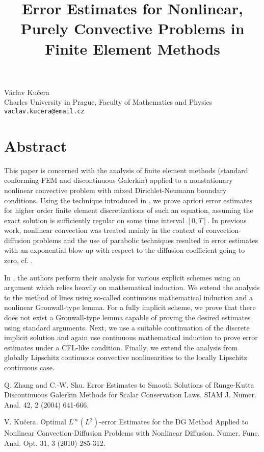 \title{Error Estimates for Nonlinear, Purely Convective Problems in Finite Element Methods}
 \author{} \institute{}
\maketitle
\begin{center}
{\large V\'{a}clav Ku\v{c}era}\\
Charles University in Prague, Faculty of Mathematics and Physics\\
{\tt vaclav.kucera@email.cz}

\end{center}

\section*{Abstract}

This paper is concerned with the analysis of finite element methods (standard conforming FEM and discontinuous Galerkin) applied to a nonstationary nonlinear convective problem with mixed Dirichlet-Neumann boundary conditions. Using the technique introduced in \cite{ZhangShu}, we prove apriori error estimates for higher order finite element discretizations of such an equation, assuming the exact solution is sufficiently regular on some time interval $[0,T]$. In previous work, nonlinear convection was treated mainly in the context of convection-diffusion problems and the use of parabolic techniques resulted in error estimates with an exponential blow up with respect to the diffusion coefficient going to zero, cf. \cite{Moje}. 

In \cite{ZhangShu}, the authors perform their analysis for various explicit schemes using an argument which relies heavily on mathematical induction. We extend the analysis to the method of lines using so-called continuous mathematical induction and a nonlinear Gronwall-type lemma. For a fully implicit scheme, we prove that there does not exist a Gronwall-type lemma capable of proving the desired estimates using standard arguments. Next, we use a suitable continuation of the discrete implicit solution and again use continuous mathematical induction to prove error estimates under a CFL-like condition. Finally, we extend the analysis from globally Lipschitz continuous convective nonlinearities to the locally Lipschitz continuous case.


\begin{thebibliography}{10}

{\sc Q. Zhang and C.-W. Shu}. {Error Estimates to Smooth Solutions of Runge-Kutta Discontinuous Galerkin Methods for Scalar Conservation Laws}. SIAM J. Numer. Anal. 42, 2 (2004) 641-666.



{\sc V. Ku\v{c}era}. {Optimal $L^\infty(L^2)$-error Estimates for the DG Method Applied to Nonlinear Convection-Diffusion Problems with Nonlinear Diffusion}. Numer. Func. Anal. Opt. 31, 3 (2010) 285-312.

\end{thebibliography}
